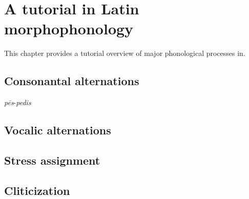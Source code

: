 \chapter{A tutorial in Latin morphophonology}

This chapter provides a tutorial overview of major phonological processes in.

\section{Consonantal alternations}

\emph{pēs}-\emph{pedis}

\section{Vocalic alternations}

\section{Stress assignment}

\section{Cliticization}
